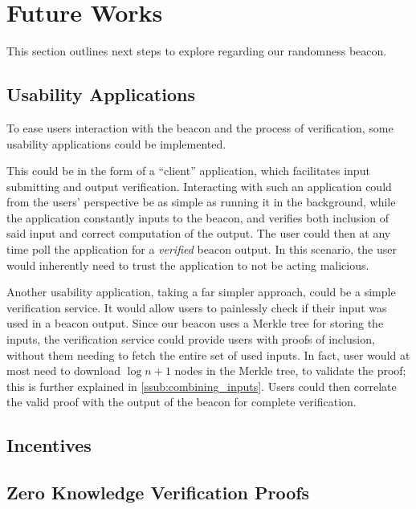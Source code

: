 \section{Future Works}%
\label{sec:future_works}
This section outlines next steps to explore regarding our randomness beacon.


\subsection{Usability Applications}%
\label{sub:usability_applications}
To ease users interaction with the beacon and the process of verification, some usability applications could be implemented.

This could be in the form of a \enquote{client} application, which facilitates input submitting and output verification.
Interacting with such an application could from the users' perspective be as simple as running it in the background, while the application constantly inputs to the beacon, and verifies both inclusion of said input and correct computation of the output.
The user could then at any time poll the application for a \emph{verified} beacon output.
In this scenario, the user would inherently need to trust the application to not be acting malicious.

Another usability application, taking a far simpler approach, could be a simple verification service.
It would allow users to painlessly check if their input was used in a beacon output.
Since our beacon uses a Merkle tree for storing the inputs, the verification service could provide users with proofs of inclusion, without them needing to fetch the entire set of used inputs.
In fact, user would at most need to download $\log{n} + 1$ nodes in the Merkle tree, to validate the proof; this is further explained in \vref{ssub:combining_inputs}.
Users could then correlate the valid proof with the output of the beacon for complete verification.

\subsection{Incentives}

\subsection{Zero Knowledge Verification Proofs}%
\label{sub:zero_knowledge_verification_proofs}

